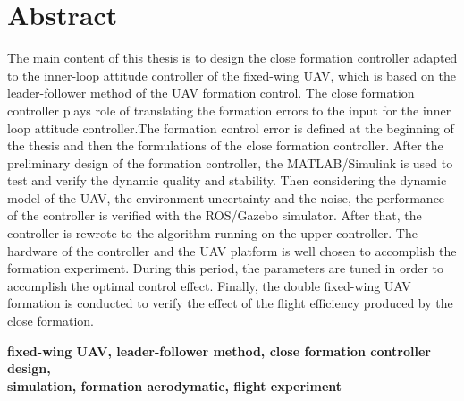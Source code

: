 \vspace*{17mm}

{\let\clearpage\relax \chapter*{
  \textmd{Abstract}\vskip -3bp}}
\setcounter{page}{2}

\setlength{\parskip}{0em}

The main content of this thesis is to design the close formation controller adapted to the inner-loop attitude controller of the fixed-wing UAV, which is based on the leader-follower method of the UAV formation control. The close formation controller plays role of translating the formation errors to the input for the inner loop attitude controller.The formation control error is defined at the beginning of the thesis and then the formulations of the close formation controller. After the preliminary design of the formation controller, the MATLAB/Simulink is used to test and verify the dynamic quality and stability. Then considering the dynamic model of the  UAV, the environment uncertainty and the noise, the performance of the controller is verified with the ROS/Gazebo simulator. After that, the controller is rewrote to the algorithm running on the upper controller. The hardware of the controller and the UAV platform is well chosen to accomplish the formation experiment. During this period, the parameters are tuned in order to accomplish the optimal control effect.
Finally, the double fixed-wing UAV formation is conducted to verify the effect of the flight efficiency produced by the close formation.

\vspace{3ex}\noindent\textbf{fixed-wing UAV, leader-follower method, close formation controller design,\\simulation, formation aerodymatic, flight experiment}
\newpage
